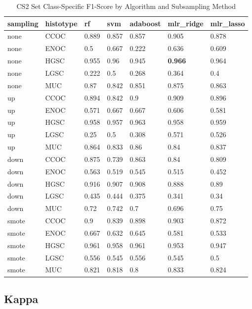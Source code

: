 \documentclass[
]{report}
\begin{document}
\begin{table}

\caption{\label{tab:cs2-f1-class-table}CS2 Set Class-Specific F1-Score by Algorithm and Subsampling Method}
\centering
\begin{tabular}[t]{l|l|l|l|l|l|l}
\hline
sampling & histotype & rf & svm & adaboost & mlr\_ridge & mlr\_lasso\\
\hline
none & CCOC & 0.889 & 0.857 & 0.857 & 0.905 & 0.878\\
\hline
none & ENOC & 0.5 & 0.667 & 0.222 & 0.636 & 0.609\\
\hline
none & HGSC & 0.955 & 0.96 & 0.945 & \textbf{0.966} & 0.964\\
\hline
none & LGSC & 0.222 & 0.5 & 0.268 & 0.364 & 0.4\\
\hline
none & MUC & 0.87 & 0.842 & 0.851 & 0.875 & 0.863\\
\hline
up & CCOC & 0.894 & 0.842 & 0.9 & 0.909 & 0.896\\
\hline
up & ENOC & 0.571 & 0.667 & 0.667 & 0.606 & 0.581\\
\hline
up & HGSC & 0.958 & 0.957 & 0.963 & 0.958 & 0.959\\
\hline
up & LGSC & 0.25 & 0.5 & 0.308 & 0.571 & 0.526\\
\hline
up & MUC & 0.864 & 0.833 & 0.86 & 0.84 & 0.837\\
\hline
down & CCOC & 0.875 & 0.739 & 0.863 & 0.84 & 0.809\\
\hline
down & ENOC & 0.563 & 0.519 & 0.545 & 0.515 & 0.452\\
\hline
down & HGSC & 0.916 & 0.907 & 0.908 & 0.888 & 0.89\\
\hline
down & LGSC & 0.435 & 0.444 & 0.375 & 0.341 & 0.34\\
\hline
down & MUC & 0.72 & 0.742 & 0.7 & 0.696 & 0.75\\
\hline
smote & CCOC & 0.9 & 0.839 & 0.898 & 0.903 & 0.872\\
\hline
smote & ENOC & 0.667 & 0.632 & 0.645 & 0.581 & 0.533\\
\hline
smote & HGSC & 0.961 & 0.958 & 0.961 & 0.953 & 0.947\\
\hline
smote & LGSC & 0.556 & 0.545 & 0.556 & 0.545 & 0.5\\
\hline
smote & MUC & 0.821 & 0.818 & 0.8 & 0.833 & 0.824\\
\hline
\end{tabular}
\end{table}

\hypertarget{kappa-2}{%
\subsection{Kappa}\label{kappa-2}}
\end{document}
